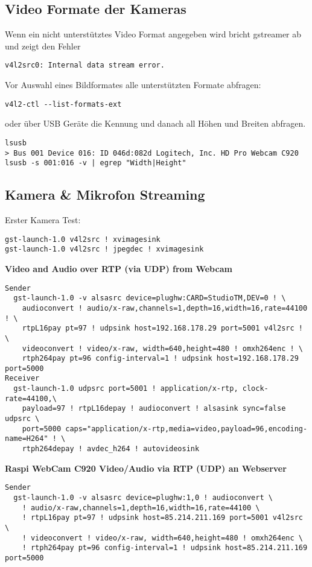 \subsection{Video Formate der Kameras}
Wenn ein nicht unterstütztes Video Format angegeben wird bricht gstreamer ab und zeigt den Fehler
\begin{verbatim}
v4l2src0: Internal data stream error.
\end{verbatim}

Vor Auswahl eines Bildformates alle unterstützten Formate 
abfragen:
\begin{verbatim}
v4l2-ctl --list-formats-ext
\end{verbatim}

oder über USB Geräte die Kennung und danach all Höhen und Breiten abfragen.
\begin{verbatim}
lsusb
> Bus 001 Device 016: ID 046d:082d Logitech, Inc. HD Pro Webcam C920
lsusb -s 001:016 -v | egrep "Width|Height"
\end{verbatim}

\subsection{Kamera \& Mikrofon Streaming}
Erster Kamera Test:
\begin{verbatim}
gst-launch-1.0 v4l2src ! xvimagesink
gst-launch-1.0 v4l2src ! jpegdec ! xvimagesink
\end{verbatim}

\textbf{Video and Audio over RTP (via UDP) from Webcam}
\begin{verbatim}
Sender
  gst-launch-1.0 -v alsasrc device=plughw:CARD=StudioTM,DEV=0 ! \
    audioconvert ! audio/x-raw,channels=1,depth=16,width=16,rate=44100 ! \
    rtpL16pay pt=97 ! udpsink host=192.168.178.29 port=5001 v4l2src ! \
    videoconvert ! video/x-raw, width=640,height=480 ! omxh264enc ! \
    rtph264pay pt=96 config-interval=1 ! udpsink host=192.168.178.29 port=5000
Receiver
  gst-launch-1.0 udpsrc port=5001 ! application/x-rtp, clock-rate=44100,\
    payload=97 ! rtpL16depay ! audioconvert ! alsasink sync=false udpsrc \
    port=5000 caps="application/x-rtp,media=video,payload=96,encoding-name=H264" ! \
    rtph264depay ! avdec_h264 ! autovideosink
\end{verbatim}


\textbf{Raspi WebCam C920 Video/Audio via RTP (UDP) an Webserver}
\begin{verbatim}
Sender
  gst-launch-1.0 -v alsasrc device=plughw:1,0 ! audioconvert \
    ! audio/x-raw,channels=1,depth=16,width=16,rate=44100 \
    ! rtpL16pay pt=97 ! udpsink host=85.214.211.169 port=5001 v4l2src \
    ! videoconvert ! video/x-raw, width=640,height=480 ! omxh264enc \
    ! rtph264pay pt=96 config-interval=1 ! udpsink host=85.214.211.169 port=5000
\end{verbatim}

